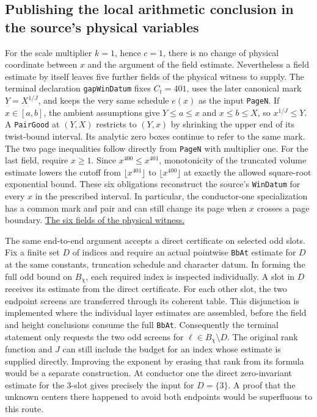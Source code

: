 \documentclass[12pt,letterpaper]{article}
\begin{document}
\subsection{Publishing the local arithmetic conclusion in the source's physical variables}

For the scale multiplier $k=1$, hence $c=1$, there is no change of physical coordinate between $x$ and the argument of the field estimate. Nevertheless a field estimate by itself leaves five further fields of the physical witness to supply. The terminal declaration \texttt{gapWinDatum} fixes $C_t=401$, uses the later canonical mark $Y=X^{1/J}$, and keeps the very same schedule $e(x)$ as the input \texttt{PageN}. If $x\in[a,b]$, the ambient assumptions give $Y\le a\le x$ and $x\le b\le X$, so $x^{1/J}\le Y$. A \texttt{PairGood} at $(Y,X)$ restricts to $(Y,x)$ by shrinking the upper end of its twist-bound interval. Its analytic zero boxes continue to refer to the same mark. The two page inequalities follow directly from \texttt{PageN} with multiplier one. For the last field, require $x\ge1$. Since $x^{400}\le x^{401}$, monotonicity of the truncated volume estimate lowers the cutoff from $\lfloor x^{401}\rfloor$ to $\lfloor x^{400}\rfloor$ at exactly the allowed square-root exponential bound. These six obligations reconstruct the source's \texttt{WinDatum} for every $x$ in the prescribed interval. In particular, the conductor-one specialization has a common mark and pair and can still change its page when $x$ crosses a page boundary. \href{https://github.com/nousentllc/riemann-hypothesis/blob/40e56bab026552e089d7afcfeff08d2defb9c005/src/Development/AutomorphicArithmetic/CharacterBoxes/TwistForm.lean#L19-L26}{The six fields of the physical witness.}

The same end-to-end argument accepts a direct certificate on selected odd slots. Fix a finite set $D$ of indices and require an actual pointwise \texttt{BbAt} estimate for $D$ at the same constants, truncation schedule and character datum. In forming the full odd bound on $B_\chi$, each required index is inspected individually. A slot in $D$ receives its estimate from the direct certificate. For each other slot, the two endpoint screens are transferred through its coherent table. This disjunction is implemented where the individual layer estimates are assembled, before the field and height conclusions consume the full \texttt{BbAt}. Consequently the terminal statement only requests the two odd screens for $\ell\in B_\chi\setminus D$. The original rank function and $J$ can still include the budget for an index whose estimate is supplied directly. Improving the exponent by erasing that rank from its formula would be a separate construction. At conductor one the direct zero-invariant estimate for the $3$-slot gives precisely the input for $D=\{3\}$. A proof that the unknown centers there happened to avoid both endpoints would be superfluous to this route.
\end{document}
